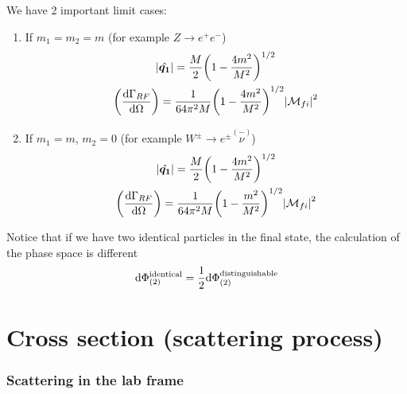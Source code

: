 \documentclass[TheoreticalPhy_ModB.tex]{subfiles}
\begin{document}
\begin{example}[1 $\to$ 2 decay]
We have 2 important limit cases:
\begin{enumerate}[label=(\alph*)]
\item If $m_1 = m_2 = m$ (for example $Z \to e^+ e^-$)
	\begin{gather}
	\abs{\hat{\boldsymbol{q_1}}} = \frac{M}{2} \biggl( 1 - \frac{4 m^2}{M^2} \biggr)^{1/2} \notag \\
	\biggl( \frac{\textup{d} \Gamma_{RF}}{\textup{d} \Omega} \biggr) = \frac{1}{64 \pi^2 M} \biggl( 1 - \frac{4 m^2}{M^2} \biggl)^{1/2} \abs{\mathcal{M}_{fi}}^2 \notag
	\end{gather}
\item If $m_1 = m$, $m_2 = 0$ (for example $W^{\pm} \to e^{\pm} \stackrel{(-)}{\nu}$)
	\begin{gather}
	\abs{\hat{\boldsymbol{q_1}}} = \frac{M}{2} \biggl( 1 - \frac{4 m^2}{M^2} \biggr)^{1/2} \notag \\
	\biggl( \frac{\textup{d} \Gamma_{RF}}{\textup{d} \Omega} \biggr) = \frac{1}{64 \pi^2 M} \biggl( 1 - \frac{m^2}{M^2} \biggr)^{1/2} \abs{\mathcal{M}_{fi}}^2 \notag
	\end{gather}
\end{enumerate}
Notice that if we have two identical particles in the final state, the calculation of the phase space is different
\[
\textup{d} \Phi_{(2)}^{\textup{identical}} = \frac{1}{2} \textup{d} \Phi_{(2)}^{\textup{distinguishable}}
\]
\end{example}

\section{Cross section (scattering process)}

\begin{center}

\end{center}

\subsubsection{Scattering in the lab frame}

\begin{center}

\end{center}
\end{document}
